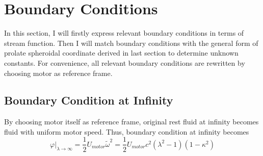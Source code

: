 \documentclass[fontsize=11pt, %
                             paper=a4, %
                             twoside, %
                             captions=tableheading,
                             index=totoc,
                             hyperref]{labbook}
\begin{document}
\section{Boundary Conditions}
In this section, I will firstly express relevant boundary conditions in terms of stream function. Then I will match boundary conditions with the general form of prolate spheroidal coordinate derived in last section to determine unknown constants. For convenience, all  relevant boundary conditions are rewritten by choosing motor as reference frame.
\subsection{Boundary Condition at Infinity}
By choosing motor itself as reference frame, original rest fluid at infinity becomes fluid with uniform motor speed. Thus, boundary condition at infinity becomes
\begin{equation}
\varphi|_{\lambda\rightarrow\infty}=\frac{1}{2}U_{motor}\tilde{\omega}^2=\frac{1}{2}U_{motor}c^2(\lambda^2-1)(1-\kappa^2)
\end{equation}
\end{document}
